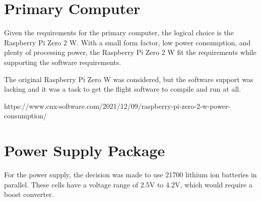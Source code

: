 \section{Primary Computer}

Given the requirements for the primary computer, the logical choice is the
Raspberry Pi Zero 2 W. With a small form factor, low power consumption, and
plenty of processing power, the Raspberry Pi Zero 2 W fit the requirements
while supporting the software requirements.

The original Raspberry Pi Zero W was considered, but the software support 
was lacking and it was a task to get the flight software to compile and run
at all.

https://www.cnx-software.com/2021/12/09/raspberry-pi-zero-2-w-power-consumption/

\section{Power Supply Package}

For the power supply, the decision was made to use 21700 lithium ion batteries
in parallel. These cells have a voltage range of 2.5V to 4.2V, which would
require a boost converter.